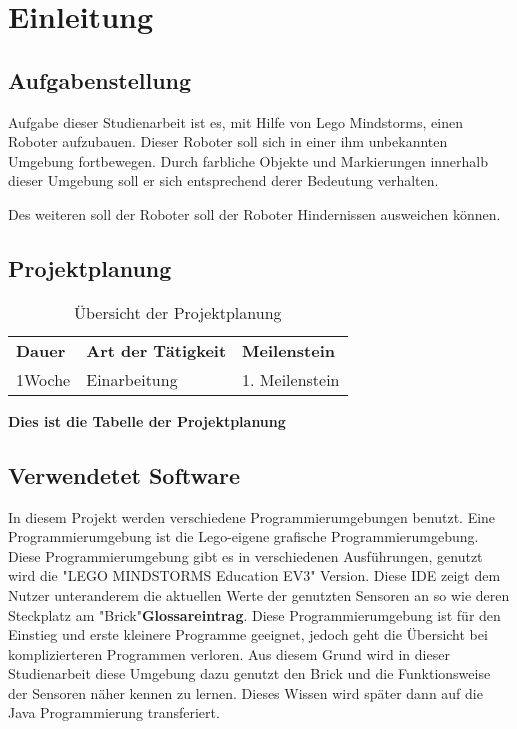 \chapter{Einleitung}
\section{Aufgabenstellung}
Aufgabe dieser Studienarbeit ist es, mit Hilfe von Lego Mindstorms, einen Roboter aufzubauen. Dieser Roboter soll sich in einer ihm unbekannten Umgebung fortbewegen. Durch farbliche Objekte und Markierungen innerhalb dieser Umgebung soll er sich entsprechend derer Bedeutung verhalten. 

Des weiteren soll der Roboter soll der Roboter Hindernissen ausweichen können. 

\section{Projektplanung}
\begin{table}[htp]
\centering
\begin{tabularx}{\textwidth}{|X|X|X|}
\cline{1-3}
  \textbf{ Dauer}&\textbf{Art der Tätigkeit}&\textbf{Meilenstein} \\\cline{1-3}
  1Woche& Einarbeitung & 1. Meilenstein\\\cline{1-3}
\end{tabularx}
\caption{Übersicht der Projektplanung}
\label{tab:projektplaung}
\end{table}
\textbf{Dies ist die Tabelle der Projektplanung}

\section{Verwendetet Software}
In diesem Projekt werden verschiedene Programmierumgebungen benutzt. Eine Programmierumgebung ist die Lego-eigene grafische Programmierumgebung. Diese Programmierumgebung gibt es in verschiedenen Ausführungen, genutzt wird die "LEGO MINDSTORMS Education EV3" Version. Diese IDE zeigt dem Nutzer unteranderem die aktuellen Werte der genutzten Sensoren an so wie deren Steckplatz am "Brick"\textbf{Glossareintrag}. Diese Programmierumgebung ist für den Einstieg und erste kleinere Programme geeignet, jedoch geht die Übersicht bei komplizierteren Programmen verloren. Aus diesem Grund wird in dieser Studienarbeit diese Umgebung dazu genutzt den Brick und die Funktionsweise der Sensoren näher kennen zu lernen. Dieses Wissen wird später dann auf die Java Programmierung transferiert.

